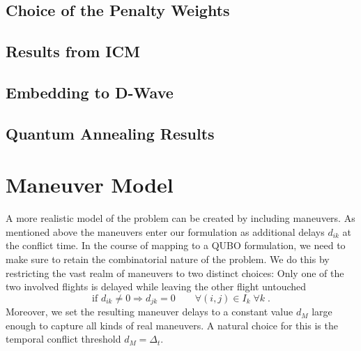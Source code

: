 \documentclass[aps,pra,twocolumn,10pt]{revtex4-1}
\begin{document}
\subsection{Choice of the Penalty Weights}
\subsection{Results from ICM}
\subsection{Embedding to D-Wave}
\subsection{Quantum Annealing Results}

\section{Maneuver Model}
A more realistic model of the problem can be created by including maneuvers.
As mentioned above the maneuvers enter our formulation as additional delays $d_{ik}$ at the conflict time.
In the course of mapping to a QUBO formulation, we need to make sure to retain the combinatorial nature of the problem.
We do this by restricting the vast realm of maneuvers to two distinct choices:
Only one of the two involved flights is delayed while leaving the other flight untouched
\begin{equation} \label{eqn:maneuver_model_maneuver_decision}
    \text{if } d_{ik} \neq 0 \Rightarrow d_{jk} = 0  \qquad \forall (i, j) \in I_k \; \forall k \; .
\end{equation}
Moreover, we set the resulting maneuver delays to a constant value $d_M$ large enough to capture all kinds of real maneuvers.
A natural choice for this is the temporal conflict threshold $d_M = \Delta_t$.
\end{document}
